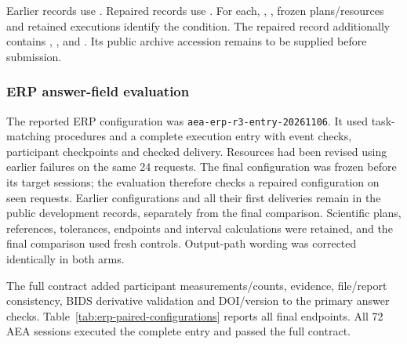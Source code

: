 Earlier records use . Repaired records use . For each, , , frozen plans/resources and retained executions identify the condition. The repaired record additionally contains , ,  and . Its public archive accession remains to be supplied before submission.

\subsubsection*{ERP answer-field evaluation}
\label{si:erp-paired}

The reported ERP configuration was \texttt{aea-erp-r3-entry-20261106}. It used task-matching procedures and a complete execution entry with event checks, participant checkpoints and checked delivery. Resources had been revised using earlier failures on the same 24 requests. The final configuration was frozen before its target sessions; the evaluation therefore checks a repaired configuration on seen requests. Earlier configurations and all their first deliveries remain in the public development records, separately from the final comparison. Scientific plans, references, tolerances, endpoints and interval calculations were retained, and the final comparison used fresh controls. Output-path wording was corrected identically in both arms.

The full contract added participant measurements/counts, evidence, file/report consistency, BIDS derivative validation and DOI/version to the primary answer checks. Table~\ref*{tab:erp-paired-configurations} reports all final endpoints. All 72 AEA sessions executed the complete entry and passed the full contract.

